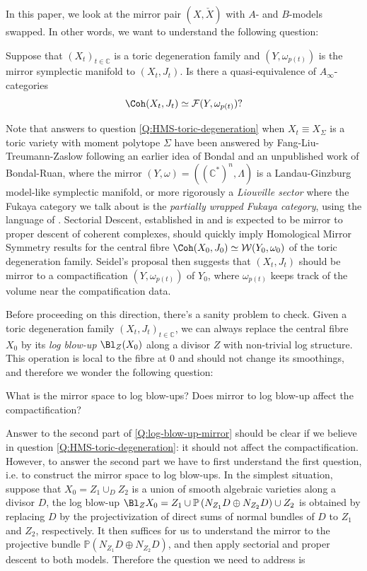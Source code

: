 In this paper, we look at the mirror pair $(X,\check{X})$ with $A$- and $B$-models swapped. In other words, we want to understand the following question:
\begin{ques}\label{Q:HMS-toric-degeneration}
    Suppose that $(X_t)_{t\in\mathbb{C}}$ is a toric degeneration family and $(Y,\omega_{p(t)})$ is the mirror symplectic manifold to $(X_t, J_t)$. Is there a quasi-equivalence of $A_{\infty}$-categories \[
        \Coh (X_t,J_t)\simeq\mathcal{F} (Y,\omega_{p(t)})?
    \]
\end{ques}
Note that answers to question \ref{Q:HMS-toric-degeneration} when $X_t\equiv X_{\Sigma}$ is a toric variety with moment polytope $\Sigma$ have been answered by Fang-Liu-Treumann-Zaslow \cite{FLTZ12} following an earlier idea of Bondal \cite{Bondal06} and an unpublished work of Bondal-Ruan, where the mirror $(Y,\omega)=\left((\mathbb{C}^{\ast})^n,\Lambda\right)$ is a Landau-Ginzburg model-like symplectic manifold, or more rigorously a \emph{Liouville sector} where the Fukaya category we talk about is the \emph{partially wrapped Fukaya category}, using the language of \cite{GPS20,GPS24M}. Sectorial Descent, established in \cite{GPS24S} and is expected to be mirror to proper descent of coherent complexes, should quickly imply Homological Mirror Symmetry results for the central fibre $\Coh (X_0,J_0)\simeq\mathcal{W} (Y_0,\omega_0)$ of the toric degeneration family. Seidel's proposal \cite{Seidel02} then suggests that $(X_t,J_t)$ should be mirror to a compactification $(Y,\omega_{p(t)})$ of $Y_0$, where $\omega_{p(t)}$ keeps track of the volume near the compatification data.\par
Before proceeding on this direction, there's a sanity problem to check. Given a toric degeneration family $(X_t,J_t)_{t\in\mathbb{C}}$, we can always replace the central fibre $X_0$ by its \emph{log blow-up} $\Bl_Z (X_0)$ along a divisor $Z$ with non-trivial log structure. This operation is local to the fibre at $0$ and should not change its smoothings, and therefore we wonder the following question:
\begin{ques}\label{Q:log-blow-up-mirror}
    What is the mirror space to log blow-ups? Does mirror to log blow-up affect the compactification?
\end{ques}
Answer to the second part of \ref{Q:log-blow-up-mirror} should be clear if we believe in question \ref{Q:HMS-toric-degeneration}: it should not affect the compactification. However, to answer the second part we have to first understand the first question, i.e. to construct the mirror space to log blow-ups. In the simplest situation, suppose that $X_0=Z_1\cup_D Z_2$ is a union of smooth algebraic varieties along a divisor $D$, the log blow-up $\Bl_Z X_0=Z_1\cup\mathbb{P}\left(N_{Z_1} D\oplus N_{Z_2} D\right)\cup Z_2$ is obtained by replacing $D$ by the projectivization of direct sums of normal bundles of $D$ to $Z_1$ and $Z_2$, respectively. It then suffices for us to understand the mirror to the projective bundle $\mathbb{P}\left(N_{Z_1} D\oplus N_{Z_2} D\right)$, and then apply sectorial and proper descent to both models. Therefore the question we need to address is 
